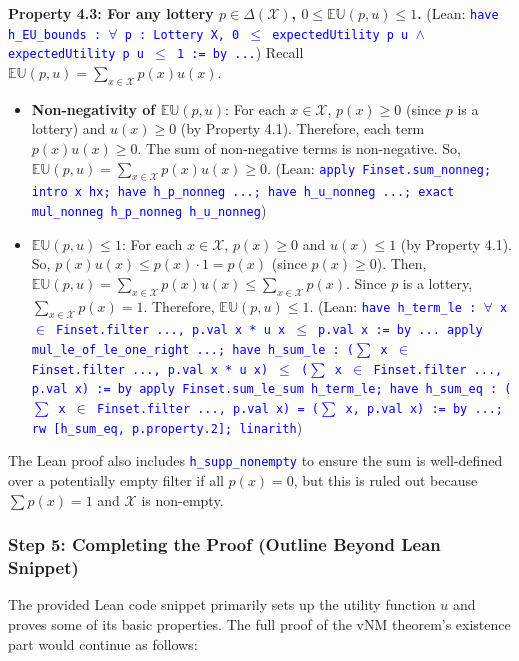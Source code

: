 \documentclass{article}
\theoremstyle{definition}
\newcommand{\X}{\mathcal{X}}
\newcommand{\EU}{\mathbb{EU}}
\newcommand{\tactic}[1]{\textcolor{blue}{\texttt{#1}}}
\newcommand{\DeltaX}{\Delta(\X)} %
\begin{document}
\textbf{Property 4.3: For any lottery $p \in \DeltaX$, $0 \le \EU(p, u) \le 1$.}
(Lean: \tactic{have h\_EU\_bounds : $\forall$ p : Lottery X, 0 $\leq$ expectedUtility p u $\wedge$ expectedUtility p u $\leq$ 1 := by ...})
Recall $\EU(p, u) = \sum_{x \in \X} p(x)u(x)$.
\begin{itemize}
    \item \textbf{Non-negativity of $\EU(p,u)$}:
    For each $x \in \X$, $p(x) \ge 0$ (since $p$ is a lottery) and $u(x) \ge 0$ (by Property 4.1).
    Therefore, each term $p(x)u(x) \ge 0$. The sum of non-negative terms is non-negative.
    So, $\EU(p, u) = \sum_{x \in \X} p(x)u(x) \ge 0$.
    (Lean: \tactic{apply Finset.sum\_nonneg; intro x hx; have h\_p\_nonneg ...; have h\_u\_nonneg ...; exact mul\_nonneg h\_p\_nonneg h\_u\_nonneg})

    \item \textbf{$\EU(p,u) \le 1$}:
    For each $x \in \X$, $p(x) \ge 0$ and $u(x) \le 1$ (by Property 4.1).
    So, $p(x)u(x) \le p(x) \cdot 1 = p(x)$ (since $p(x) \ge 0$).
    Then, $\EU(p, u) = \sum_{x \in \X} p(x)u(x) \le \sum_{x \in \X} p(x)$.
    Since $p$ is a lottery, $\sum_{x \in \X} p(x) = 1$.
    Therefore, $\EU(p, u) \le 1$.
    (Lean: \tactic{have h\_term\_le : $\forall$ x $\in$ Finset.filter ..., p.val x * u x $\leq$ p.val x := by ... apply mul\_le\_of\_le\_one\_right ...; have h\_sum\_le : ($\sum$ x $\in$ Finset.filter ..., p.val x * u x) $\leq$ ($\sum$ x $\in$ Finset.filter ..., p.val x) := by apply Finset.sum\_le\_sum h\_term\_le; have h\_sum\_eq : ($\sum$ x $\in$ Finset.filter ..., p.val x) = ($\sum$ x, p.val x) := by ...; rw [h\_sum\_eq, p.property.2]; linarith})
\end{itemize}
The Lean proof also includes \tactic{h\_supp\_nonempty} to ensure the sum is well-defined over a potentially empty filter if all $p(x)=0$, but this is ruled out because $\sum p(x)=1$ and $\X$ is non-empty.

\subsubsection{Step 5: Completing the Proof (Outline Beyond Lean Snippet)}
The provided Lean code snippet primarily sets up the utility function $u$ and proves some of its basic properties. The full proof of the vNM theorem's existence part would continue as follows:
\end{document}

